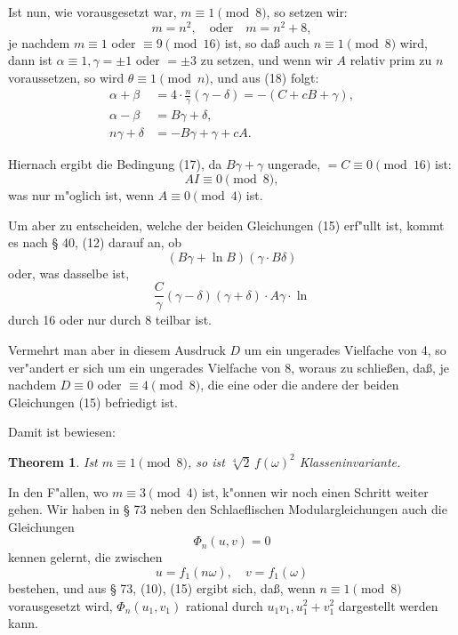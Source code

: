 \documentclass[12pt,a4paper]{article}
\theoremstyle{plain}
\newtheorem{theorem}{Theorem}[section]
\theoremstyle{definition}
\theoremstyle{remark}
\begin{document}
Ist nun, wie vorausgesetzt war, $m \equiv 1 \pmod{8}$, so setzen wir:
\begin{equation}\label{eq:19}
m = n^2, \quad \text{oder} \quad m = n^2 + 8,
\end{equation}
je nachdem $m \equiv 1$ oder $\equiv 9 \pmod{16}$ ist, so da\ss{} auch $n \equiv 1 \pmod{8}$ wird, dann ist $\alpha \equiv 1, \gamma = \pm 1$ oder $= \pm 3$ zu setzen, und wenn wir $A$ relativ prim zu $n$ voraussetzen, so wird $\theta \equiv 1 \pmod{n}$, und aus (18) folgt:
\begin{align*}
\alpha + \beta &= 4 \cdot \frac{n}{\gamma}(\gamma - \delta) = -(C + cB + \gamma), \\
\alpha - \beta &= B\gamma + \delta, \\
n\gamma + \delta &= -B\gamma + \gamma + cA.
\end{align*}

Hiernach ergibt die Bedingung (17), da $B\gamma + \gamma$ ungerade, $= C \equiv 0 \pmod{16}$ ist:
\[
AI \equiv 0 \pmod{8},
\]
was nur m"oglich ist, wenn $A \equiv 0 \pmod{4}$ ist.

Um aber zu entscheiden, welche der beiden Gleichungen (15) erf"ullt ist, kommt es nach \S{} 40, (12) darauf an, ob
\[
(B\gamma + \ln B)(\gamma \cdot B\delta)
\]
oder, was dasselbe ist,
\[
\frac{C}{\gamma}(\gamma - \delta)(\gamma + \delta) \cdot A\gamma \cdot \ln
\]
durch 16 oder nur durch 8 teilbar ist.

Vermehrt man aber in diesem Ausdruck $D$ um ein ungerades Vielfache von 4, so ver"andert er sich um ein ungerades Vielfache von 8, woraus zu schlie\ss{}en, da\ss{}, je nachdem $D \equiv 0$ oder $\equiv 4 \pmod{8}$, die eine oder die andere der beiden Gleichungen (15) befriedigt ist.

Damit ist bewiesen:

\begin{theorem}
Ist $m \equiv 1 \pmod{8}$, so ist $\sqrt[4]{2}\, f(\omega)^2$ Klasseninvariante.
\end{theorem}

In den F"allen, wo $m \equiv 3 \pmod{4}$ ist, k"onnen wir noch einen Schritt weiter gehen. Wir haben in \S{} 73 neben den Schlaeflischen Modulargleichungen auch die Gleichungen
\begin{equation}\label{eq:19mod}
\Phi_n(u, v) = 0
\end{equation}
kennen gelernt, die zwischen
\[
u = f_1(n\omega), \quad v = f_1(\omega)
\]
bestehen, und aus \S{} 73, (10), (15) ergibt sich, da\ss{}, wenn $n \equiv 1 \pmod{8}$ vorausgesetzt wird, $\Phi_n(u_1, v_1)$ rational durch $u_1 v_1, u_1^2 + v_1^2$ dargestellt werden kann.
\end{document}
